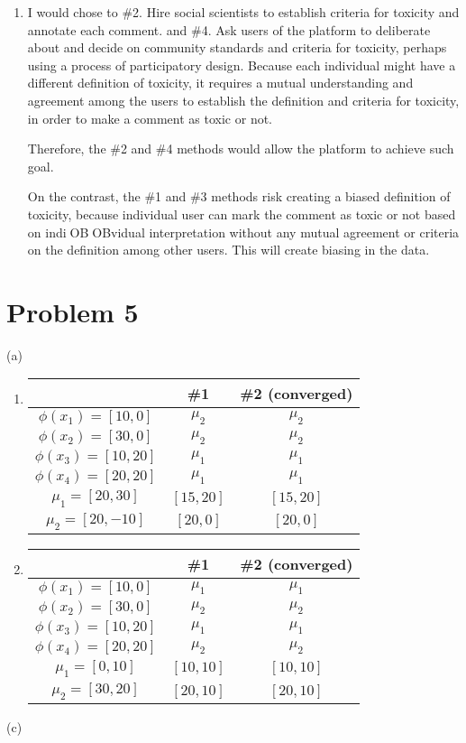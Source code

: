 \documentclass[12pt]{article}
\begin{document}
\begin{enumerate}[label=(\alph*)]
\item
I would chose to \#2. Hire social scientists to establish criteria for toxicity and annotate each comment. and \#4. Ask users of the platform to deliberate about and decide on community standards and criteria for toxicity, perhaps using a process of participatory design. Because each individual might have a different definition of toxicity, it requires a mutual understanding and agreement among the users to establish the definition and criteria for toxicity, in order to make a comment as toxic or not.

Therefore, the \#2 and \#4 methods would allow the platform to achieve such goal.

On the contrast, the \#1 and \#3 methods risk creating a biased definition of toxicity, because individual user can mark the comment as toxic or not based on indiOBOBvidual interpretation without any mutual agreement or criteria on the definition among other users. This will create biasing in the data.
\end{enumerate}

\section*{Problem 5}

(a)

\begin{enumerate}[label=\arabic*.]
\item

\begin{tabular}{ |c|c|c| }
 \hline
    & \#1 & \#2 (converged) \\
  \hline
\(\phi(x_1) = [10, 0]\) & \(\mu_2\) & \(\mu_2\) \\
\(\phi(x_2)= [30, 0]\) & \(\mu_2\) & \(\mu_2\) \\
\(\phi(x_3)= [10, 20]\) & \(\mu_1\) & \(\mu_1\) \\
\(\phi(x_4)= [20, 20]\) & \(\mu_1\) & \(\mu_1\) \\
 \hline
\(\mu_1= [20, 30]\) & \([15, 20]\) &  \([15, 20]\) \\
\(\mu_2= [20, -10]\) & \([20, 0]\) & \([20, 0]\)  \\
 \hline
\end{tabular}

\item

\begin{tabular}{ |c|c|c| }
 \hline
    & \#1 & \#2 (converged) \\
  \hline
\(\phi(x_1) = [10, 0]\) & \(\mu_1\) & \(\mu_1\) \\
\(\phi(x_2)= [30, 0]\) & \(\mu_2\) & \(\mu_2\) \\
\(\phi(x_3)= [10, 20]\) & \(\mu_1\) & \(\mu_1\) \\
\(\phi(x_4)= [20, 20]\) & \(\mu_2\) & \(\mu_2\) \\
 \hline
\(\mu_1= [0, 10]\) & \([10, 10]\) & \([10, 10]\) \\
\(\mu_2= [30, 20]\) & \([20, 10]\)& \([20, 10]\) \\
 \hline
\end{tabular}
\end{enumerate}
(c)
\end{document}
